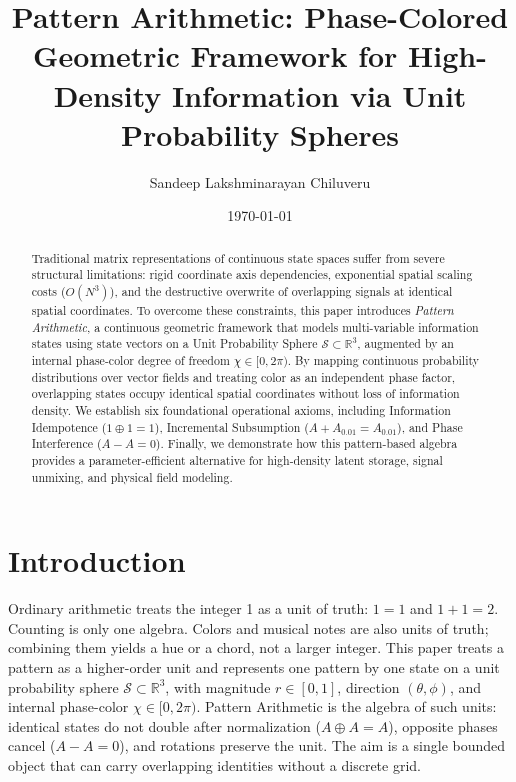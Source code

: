 \documentclass[12pt, a4paper]{article}
\title{Pattern Arithmetic: Phase-Colored Geometric Framework for High-Density Information via Unit Probability Spheres}
\author{Sandeep Lakshminarayan Chiluveru}
\date{\today}
\begin{document}
\maketitle

\begin{abstract}
Traditional matrix representations of continuous state spaces suffer from severe structural limitations: rigid coordinate axis dependencies, exponential spatial scaling costs ($O(N^3)$), and the destructive overwrite of overlapping signals at identical spatial coordinates. To overcome these constraints, this paper introduces \textit{Pattern Arithmetic}, a continuous geometric framework that models multi-variable information states using state vectors on a Unit Probability Sphere $\mathcal{S} \subset \mathbb{R}^3$, augmented by an internal phase-color degree of freedom $\chi \in [0, 2\pi)$. By mapping continuous probability distributions over vector fields and treating color as an independent phase factor, overlapping states occupy identical spatial coordinates without loss of information density. We establish six foundational operational axioms, including Information Idempotence ($1 \oplus 1 = 1$), Incremental Subsumption ($A + A_{0.01} = A_{0.01}$), and Phase Interference ($A - A = 0$). Finally, we demonstrate how this pattern-based algebra provides a parameter-efficient alternative for high-density latent storage, signal unmixing, and physical field modeling.
\end{abstract}

\section{Introduction}

Ordinary arithmetic treats the integer 1 as a unit of truth: $1=1$ and $1+1=2$. Counting is only one algebra. Colors and musical notes are also units of truth; combining them yields a hue or a chord, not a larger integer. This paper treats a pattern as a higher-order unit and represents one pattern by one state on a unit probability sphere $\mathcal{S} \subset \mathbb{R}^3$, with magnitude $r \in [0, 1]$, direction $(\theta, \phi)$, and internal phase-color $\chi \in [0, 2\pi)$. Pattern Arithmetic is the algebra of such units: identical states do not double after normalization ($A \oplus A = A$), opposite phases cancel ($A - A = 0$), and rotations preserve the unit. The aim is a single bounded object that can carry overlapping identities without a discrete grid.
\end{document}
